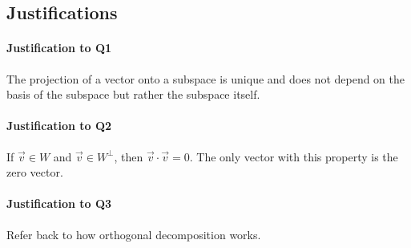 	\subsection{Justifications}
	\paragraph{Justification to Q1} The projection of a vector onto a subspace is unique and does not depend on the basis of the subspace but rather the 
						      subspace itself.
	\paragraph{Justification to Q2} If \(\vec{v} \in W\) and \(\vec{v} \in W^\perp\), then \(\vec{v} \cdot \vec{v} = 0\). The only vector with this property is the
						      zero vector.
	\paragraph{Justification to Q3} Refer back to how orthogonal decomposition works.


